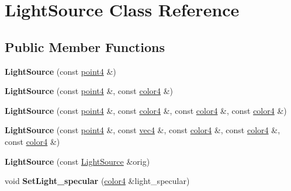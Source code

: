 \hypertarget{class_light_source}{\section{Light\-Source Class Reference}
\label{class_light_source}
}
\subsection*{Public Member Functions}
\begin{DoxyCompactItemize}
\item 
\hypertarget{class_light_source_a83e373049e705227216bea0ec9774f18}{{\bfseries Light\-Source} (const \hyperlink{struct_angel_1_1vec4}{point4} \&)}\label{class_light_source_a83e373049e705227216bea0ec9774f18}

\item 
\hypertarget{class_light_source_a991346373d3ded70727b07416cd1c04d}{{\bfseries Light\-Source} (const \hyperlink{struct_angel_1_1vec4}{point4} \&, const \hyperlink{struct_angel_1_1vec4}{color4} \&)}\label{class_light_source_a991346373d3ded70727b07416cd1c04d}

\item 
\hypertarget{class_light_source_aec26fce93563c0b1719a211b9b49193f}{{\bfseries Light\-Source} (const \hyperlink{struct_angel_1_1vec4}{point4} \&, const \hyperlink{struct_angel_1_1vec4}{color4} \&, const \hyperlink{struct_angel_1_1vec4}{color4} \&, const \hyperlink{struct_angel_1_1vec4}{color4} \&)}\label{class_light_source_aec26fce93563c0b1719a211b9b49193f}

\item 
\hypertarget{class_light_source_a7ed30701ee0865f8cc60af7de633714b}{{\bfseries Light\-Source} (const \hyperlink{struct_angel_1_1vec4}{point4} \&, const \hyperlink{struct_angel_1_1vec4}{vec4} \&, const \hyperlink{struct_angel_1_1vec4}{color4} \&, const \hyperlink{struct_angel_1_1vec4}{color4} \&, const \hyperlink{struct_angel_1_1vec4}{color4} \&)}\label{class_light_source_a7ed30701ee0865f8cc60af7de633714b}

\item 
\hypertarget{class_light_source_a71dbbd92599046fb93fb1e7740088947}{{\bfseries Light\-Source} (const \hyperlink{class_light_source}{Light\-Source} \&orig)}\label{class_light_source_a71dbbd92599046fb93fb1e7740088947}

\item 
\hypertarget{class_light_source_a5a599502b38a1875ada2579f6c8300ba}{void {\bfseries Set\-Light\-\_\-specular} (\hyperlink{struct_angel_1_1vec4}{color4} \&light\-\_\-specular)}\label{class_light_source_a5a599502b38a1875ada2579f6c8300ba}


\end{DoxyCompactItemize}

